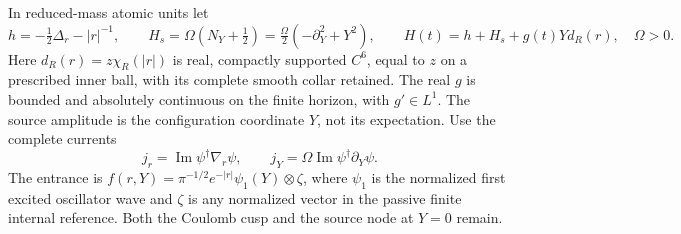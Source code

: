 \documentclass[11pt]{article}
\numberwithin{equation}{section}
\theoremstyle{definition}
\theoremstyle{remark}
\begin{document}
In reduced-mass atomic units let
\begin{equation}\label{p3d:eq:HQA}
 h=-\tfrac12\Delta_r-|r|^{-1},\qquad
 H_s=\Omega(N_Y+\tfrac12)=\tfrac\Omega2(-\partial_Y^2+Y^2),\qquad
 H(t)=h+H_s+g(t)Yd_R(r),\quad \Omega>0.
\end{equation}
Here $d_R(r)=z\chi_R(|r|)$ is real, compactly supported $C^6$, equal
to $z$ on a prescribed inner ball, with its complete smooth collar
retained. The real $g$ is bounded and absolutely continuous on the
finite horizon, with $g'\in L^1$. The source amplitude is the
configuration coordinate $Y$, not its expectation.
Use the complete currents
\begin{equation}\label{p3d:eq:HQAcurrents}
 j_r=\operatorname{Im}\psi^\dagger\nabla_r\psi,\qquad
 j_Y=\Omega\operatorname{Im}\psi^\dagger\partial_Y\psi.
\end{equation}
The entrance is
$f(r,Y)=\pi^{-1/2}e^{-|r|}\psi_1(Y)\otimes\zeta$,
where $\psi_1$ is the normalized first excited oscillator wave and
$\zeta$ is any normalized vector in the passive finite internal
reference. Both the Coulomb cusp and the source node at $Y=0$ remain.
\end{document}
